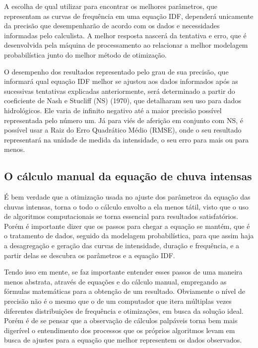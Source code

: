 A escolha de qual utilizar para encontrar os melhores parâmetros, que representam as curvas de frequência em uma equação IDF, dependerá unicamente da precisão que desempenharão de acordo com os dados e necessidades informadas pelo calculista. A melhor resposta nascerá da tentativa e erro, que é desenvolvida pela máquina de processamento ao relacionar a melhor modelagem probabilística junto do melhor método de otimização.

\newpage

O desempenho dos resultados representado pelo grau de sua precisão, que informará qual equação IDF melhor se ajustou aos dados informados após as sucessivas tentativas explicadas anteriormente, será determinado a partir do coeficiente de Nash e Stucliff (NS) (1970), que detalharam seu uso para dados hidrológicos. Ele varia de infinito negativo até a maior precisão possível representada pelo número um. Já para viés de aferição em conjunto com NS, é possível usar a Raiz do Erro Quadrático Médio (RMSE), onde o seu resultado representará na unidade de medida da intensidade, o seu erro para mais ou para menos.

\subsection{O cálculo manual da equação de chuva intensas}

É bem verdade que a otimização usada no ajuste dos parâmetros da equação das chuvas intensas, torna o todo o cálculo envolto a ela menos tátil, visto que o uso de algoritmos computacionais se torna essencial para resultados satisfatórios. Porém é importante dizer que os passos para chegar a equação se mantém, que é o tratamento de dados, seguido da modelagem probabilística, para que assim haja a desagregação e geração das curvas de intensidade, duração e frequência, e a partir delas se descubra os parâmetros e a equação IDF.

Tendo isso em mente, se faz importante entender esses passos de uma maneira menos abstrata, através de equações e do cálculo manual, empregando as fórmulas matemáticas para a obtenção de um resultado. Obviamente o nível de precisão não é o mesmo que o de um computador que itera múltiplas vezes diferentes distribuições de frequência e otimizações, em busca da solução ideal. Porém é de se pensar que a observação de cálculos palpáveis torna bem mais digerível o entendimento dos processos que os próprios algoritmos levam em busca de ajustes para a equação que melhor representem os dados observados.

